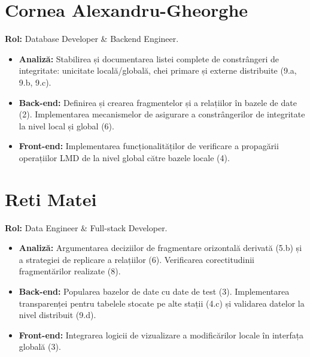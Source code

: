 \section{Cornea Alexandru-Gheorghe}
\textbf{Rol:} Database Developer \& Backend Engineer.
\begin{itemize}
\item \textbf{Analiză:} Stabilirea și documentarea listei complete de constrângeri de integritate: unicitate locală/globală, chei primare și externe distribuite (9.a, 9.b, 9.c).
\item \textbf{Back-end:} Definirea și crearea fragmentelor și a relațiilor în bazele de date (2). Implementarea mecanismelor de asigurare a constrângerilor de integritate la nivel local și global (6).
\item \textbf{Front-end:} Implementarea funcționalităților de verificare a propagării operațiilor LMD de la nivel global către bazele locale (4).
\end{itemize}

\section{Reti Matei}
\textbf{Rol:} Data Engineer \& Full-stack Developer.
\begin{itemize}
\item \textbf{Analiză:} Argumentarea deciziilor de fragmentare orizontală derivată (5.b) și a strategiei de replicare a relațiilor (6). Verificarea corectitudinii fragmentărilor realizate (8).
\item \textbf{Back-end:} Popularea bazelor de date cu date de test (3). Implementarea transparenței pentru tabelele stocate pe alte stații (4.c) și validarea datelor la nivel distribuit (9.d).
\item \textbf{Front-end:} Integrarea logicii de vizualizare a modificărilor locale în interfața globală (3).
\end{itemize}